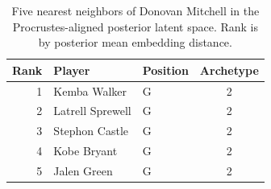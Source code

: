 \begin{table}[htbp]
  \centering\small
  \begin{tabular}{rllc}
    \toprule
    Rank & Player & Position & Archetype \\
    \midrule
    1 & Kemba Walker & G & 2 \\
    2 & Latrell Sprewell & G & 2 \\
    3 & Stephon Castle & G & 2 \\
    4 & Kobe Bryant & G & 2 \\
    5 & Jalen Green & G & 2 \\
    \bottomrule
  \end{tabular}
  \caption{Five nearest neighbors of Donovan Mitchell in the Procrustes-aligned posterior latent space. Rank is by posterior mean embedding distance.}
  \label{tab:Donovan_Mitchell_neighbors}
\end{table}

